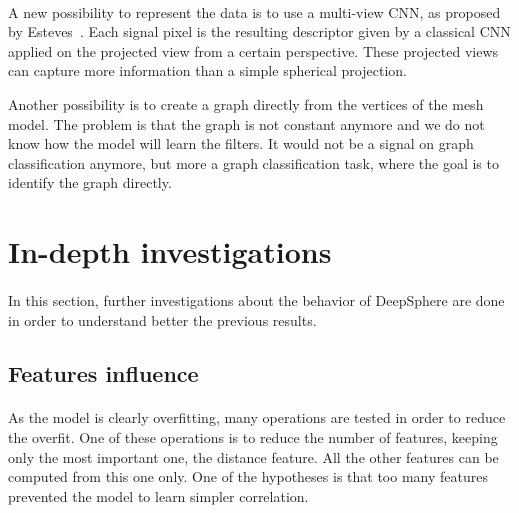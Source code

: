 \documentclass[11pt]{report}
\begin{document}
\paragraph{}
A new possibility to represent the data is to use a multi-view CNN, as proposed by Esteves~\cite{esteves_equivariant_2019}. Each signal pixel is the resulting descriptor given by a classical CNN applied on the projected view from a certain perspective. These projected views can capture more information than a simple spherical projection.

Another possibility is to create a graph directly from the vertices of the mesh model. The problem is that the graph is not constant anymore and we do not know how the model will learn the filters. It would not be a signal on graph classification anymore, but more a graph classification task, where the goal is to identify the graph directly.

\section{In-depth investigations}
\paragraph*{}
In this section, further investigations about the behavior of DeepSphere are done in order to understand better the previous results.

\subsection{Features influence}
\paragraph*{}
As the model is clearly overfitting, many operations are tested in order to reduce the overfit. One of these operations is to reduce the number of features, keeping only the most important one, the distance feature. All the other features can be computed from this one only. One of the hypotheses is that too many features prevented the model to learn simpler correlation.
\end{document}
